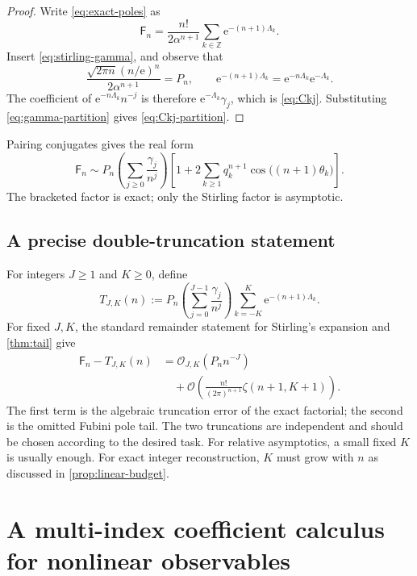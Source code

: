 \documentclass[11pt,a4paper]{article}
\theoremstyle{definition}
\theoremstyle{remark}
\newcommand{\Fub}{\mathsf F}
\newcommand{\e}{\mathrm e}
\newcommand{\cO}{\mathcal O}
\newcommand{\Z}{\mathbb Z}
\begin{document}
\begin{proof}
Write \eqref{eq:exact-poles} as
\[
 \Fub_n=\frac{n!}{2\alpha^{n+1}}
 \sum_{k\in\Z}\e^{-(n+1)\Lambda_k}.
\]
Insert \eqref{eq:stirling-gamma}, and observe that
\[
 \frac{\sqrt{2\pi n}(n/\e)^n}{2\alpha^{n+1}}=P_n,
 \qquad
 \e^{-(n+1)\Lambda_k}
 =\e^{-n\Lambda_k}\e^{-\Lambda_k}.
\]
The coefficient of \(\e^{-n\Lambda_k}n^{-j}\) is therefore
\(\e^{-\Lambda_k}\gamma_j\), which is \eqref{eq:Ckj}.  Substituting
\eqref{eq:gamma-partition} gives \eqref{eq:Ckj-partition}.
\end{proof}

Pairing conjugates gives the real form
\begin{equation}\label{eq:double-real}
 \Fub_n\sim P_n
 \left(\sum_{j\ge0}\frac{\gamma_j}{n^j}\right)
 \left[1+2\sum_{k\ge1}q_k^{n+1}
 \cos\bigl((n+1)\theta_k\bigr)\right].
\end{equation}
The bracketed factor is exact; only the Stirling factor is asymptotic.

\subsection{A precise double-truncation statement}

For integers \(J\ge1\) and \(K\ge0\), define
\begin{equation}\label{eq:TJK}
 T_{J,K}(n):=P_n
 \left(\sum_{j=0}^{J-1}\frac{\gamma_j}{n^j}\right)
 \sum_{k=-K}^{K}\e^{-(n+1)\Lambda_k}.
\end{equation}
For fixed \(J,K\), the standard remainder statement for Stirling's expansion
and \cref{thm:tail} give
\begin{align}
 \Fub_n-T_{J,K}(n)
 &={}\cO_{J,K}\!\left(P_n n^{-J}\right)
 \nonumber\\
 &\quad+\cO\!\left(
       \frac{n!}{(2\pi)^{n+1}}\zeta(n+1,K+1)
       \right).
 \label{eq:double-remainder}
\end{align}
The first term is the algebraic truncation error of the exact factorial; the
second is the omitted Fubini pole tail.  The two truncations are independent and
should be chosen according to the desired task.  For relative asymptotics, a
small fixed \(K\) is usually enough.  For exact integer reconstruction, \(K\)
must grow with \(n\) as discussed in \cref{prop:linear-budget}.

\section{A multi-index coefficient calculus for nonlinear observables}
\end{document}
